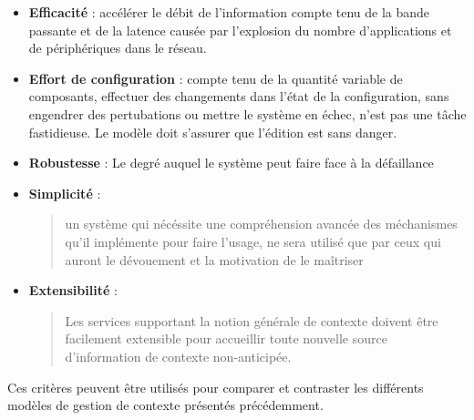 \begin{itemize}
    \item \textbf{Efficacité} : 
	    accélérer le débit de l'information compte tenu de la bande passante
	    et de la latence causée par l'explosion du nombre d'applications et
	    de périphériques dans le réseau.
    \item \textbf{Effort de configuration} : 
	    compte tenu de la quantité variable de composants, effectuer des
	    changements dans l'état de la configuration, sans engendrer des
	    pertubations ou mettre le système en échec, n'est pas une tâche
	    fastidieuse. Le modèle doit s'assurer que l'édition est sans danger.
    \item \textbf{Robustesse} : 
	    Le degré auquel le système peut faire face à la défaillance
    \item \textbf{Simplicité} : 
            \begin{quotation}
              un système qui nécéssite une compréhension avancée des méchanismes 
	      qu'il implémente pour faire l'usage, ne sera utilisé que par ceux
	      qui auront le dévouement et la motivation de le maîtriser
	      \cite{winograd_architectures_2001}
            \end{quotation}
    \item \textbf{Extensibilité} : 
            \begin{quotation}
              Les services supportant la notion générale de contexte doivent
	      être facilement extensible pour accueillir toute nouvelle source
	      d'information de contexte non-anticipée. \cite{ebling_issues_2001}
            \end{quotation}
\end{itemize}

Ces critères peuvent être utilisés pour comparer et contraster les différents
modèles de gestion de contexte présentés précédemment.

